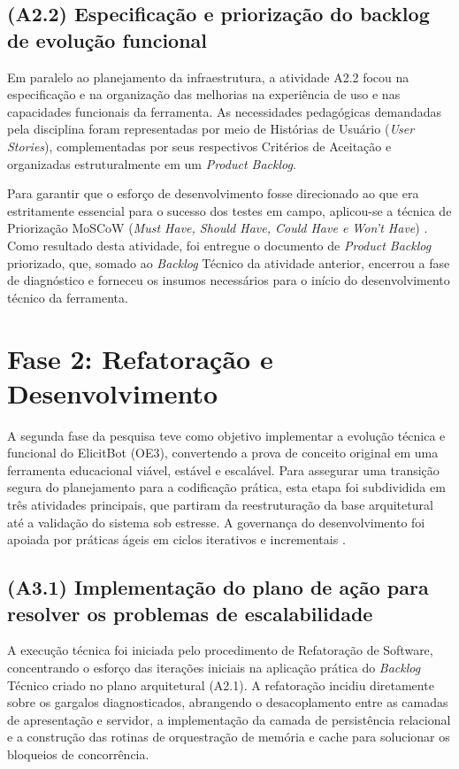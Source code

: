 \subsection{(A2.2) Especificação e priorização do backlog de evolução funcional}

Em paralelo ao planejamento da infraestrutura, a atividade A2.2 focou na especificação e na organização das melhorias na experiência de uso e nas capacidades funcionais da ferramenta. As necessidades pedagógicas demandadas pela disciplina foram representadas por meio de Histórias de Usuário (\textit{User Stories}), complementadas por seus respectivos Critérios de Aceitação e organizadas estruturalmente em um \textit{Product Backlog}.

Para garantir que o esforço de desenvolvimento fosse direcionado ao que era estritamente essencial para o sucesso dos testes em campo, aplicou-se a técnica de Priorização MoSCoW (\textit{Must Have, Should Have, Could Have e Won't Have}) \cite{agilebusiness2014}. Como resultado desta atividade, foi entregue o documento de \textit{Product Backlog} priorizado, que, somado ao \textit{Backlog} Técnico da atividade anterior, encerrou a fase de diagnóstico e forneceu os insumos necessários para o início do desenvolvimento técnico da ferramenta.

\section{Fase 2: Refatoração e Desenvolvimento}
\label{sec:fase2}

A segunda fase da pesquisa teve como objetivo implementar a evolução técnica e funcional do ElicitBot (OE3), convertendo a prova de conceito original em uma ferramenta educacional viável, estável e escalável. Para assegurar uma transição segura do planejamento para a codificação prática, esta etapa foi subdividida em três atividades principais, que partiram da reestruturação da base arquitetural até a validação do sistema sob estresse. A governança do desenvolvimento foi apoiada por práticas ágeis em ciclos iterativos e incrementais \cite{scrumstudy2024}.

\subsection{(A3.1) Implementação do plano de ação para resolver os problemas de escalabilidade}

A execução técnica foi iniciada pelo procedimento de Refatoração de Software, concentrando o esforço das iterações iniciais na aplicação prática do \textit{Backlog} Técnico criado no plano arquitetural (A2.1). A refatoração incidiu diretamente sobre os gargalos diagnosticados, abrangendo o desacoplamento entre as camadas de apresentação e servidor, a implementação da camada de persistência relacional e a construção das rotinas de orquestração de memória e cache para solucionar os bloqueios de concorrência.

